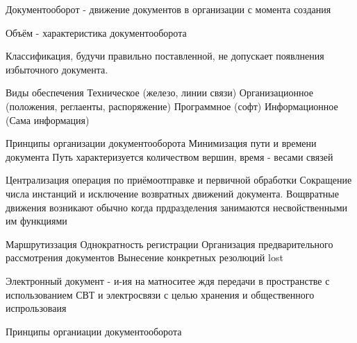 \documentclass[a4paper,12pt]{report}
\begin{document}
	Документооборот - движение документов в организации с момента создания


		Объём - характеристика документооборота

		Классификация, будучи правильно поставленной, не допускает появлнения избыточного документа.

		Виды обеспечения
			Техническое (железо, линии связи)
			Организационное (положения, реглаенты, распоряжение)
			Программное (софт)
			Информационное (Сама информация)



		Принципы организации документооборота
			Минимизация пути и времени документа
			Путь характеризуется количеством вершин, время - весами связей

			Централизация операция по приёмоотправке и первичной обработки
			Сокращение числа инстанций и исключение возвратных движений документа.
				Вощвратные движения возникают обычно когда прдразделения занимаются несвойственными им функциями

			Маршрутиззация
			Однократность регистрации
			Организация предварительного рассмотрения документов
			Вынесение конкретных резолюций
			lost


		Электронный документ - и-ия на матноситее ждя передачи в пространстве с использованием СВТ и электросвязи с целью хранения и общественного испрользоваия



	Принципы органиации документооборота



\end{document}
